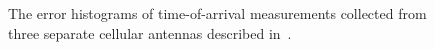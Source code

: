 \documentclass{article}
\begin{document}
%
%
\begin{figure}[]
	\centering
	\hfil
	\hfil
	\caption{The error histograms of time-of-arrival measurements collected from three separate cellular antennas described in~\cite{conf:PIMRC_medbo_09}.}
	\label{fig:kista}
\end{figure}
%
%
\end{document}
